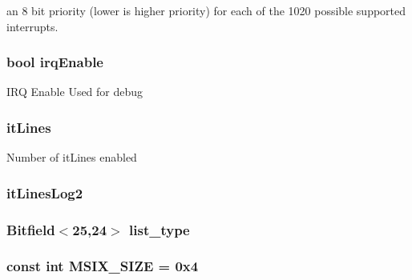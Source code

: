 an 8 bit priority (lower is higher priority) for each of the 1020 possible supported interrupts. \hypertarget{classPl390_a4dd3993efeb04a5d9c8a0820b4b09d67}{
\subsubsection[{irqEnable}]{\setlength{\rightskip}{0pt plus 5cm}bool {\bf irqEnable}}}
\label{classPl390_a4dd3993efeb04a5d9c8a0820b4b09d67}
IRQ Enable Used for debug \hypertarget{classPl390_a21dc662678d340891a1d579bf78955ce}{
\subsubsection[{itLines}]{ {\bf itLines}}}
\label{classPl390_a21dc662678d340891a1d579bf78955ce}
Number of itLines enabled \hypertarget{classPl390_a6d73a4f61a4306d3aff3e9571eeccf47}{
\subsubsection[{itLinesLog2}]{ {\bf itLinesLog2}}}
\label{classPl390_a6d73a4f61a4306d3aff3e9571eeccf47}
\hypertarget{classPl390_a6b56e232dd8fd3da34e2900f7f06039d}{
\subsubsection[{list\_\-type}]{\setlength{\rightskip}{0pt plus 5cm}Bitfield$<$25,24$>$ {\bf list\_\-type}}}
\label{classPl390_a6b56e232dd8fd3da34e2900f7f06039d}
\hypertarget{classPl390_a6f1a976e6a4f72a669c64334981f2220}{
\subsubsection[{MSIX\_\-SIZE}]{\setlength{\rightskip}{0pt plus 5cm}const int {\bf MSIX\_\-SIZE} = 0x4}}
